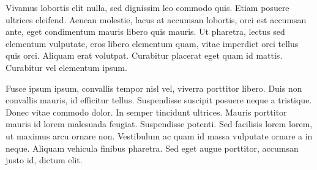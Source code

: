 Vivamus lobortis elit nulla, sed dignissim leo commodo quis. Etiam posuere ultrices eleifend. Aenean molestie, lacus at accumsan lobortis, orci est accumsan ante, eget condimentum mauris libero quis mauris. Ut pharetra, lectus sed elementum vulputate, eros libero elementum quam, vitae imperdiet orci tellus quis orci. Aliquam erat volutpat. Curabitur placerat eget quam id mattis. Curabitur vel elementum ipsum.

Fusce ipsum ipsum, convallis tempor nisl vel, viverra porttitor libero. Duis non convallis mauris, id efficitur tellus. Suspendisse suscipit posuere neque a tristique. Donec vitae commodo dolor. In semper tincidunt ultrices. Mauris porttitor mauris id lorem malesuada feugiat. Suspendisse potenti. Sed facilisis lorem lorem, ut maximus arcu ornare non. Vestibulum ac quam id massa vulputate ornare a in neque. Aliquam vehicula finibus pharetra. Sed eget augue porttitor, accumsan justo id, dictum elit. 
